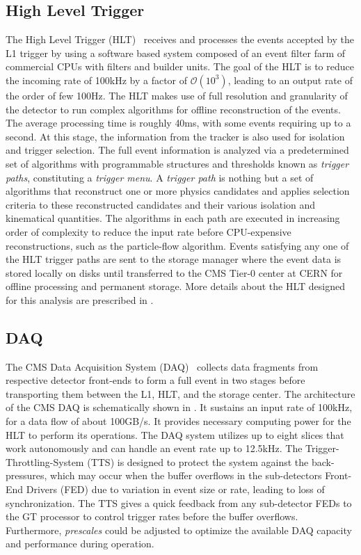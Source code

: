 \subsection{High Level Trigger}
The High Level Trigger (HLT)~\cite{daqhltTDR} receives and processes the events accepted by the L1 trigger by using a software based system
composed of an event filter farm of commercial CPUs with filters and builder units. The goal of the HLT is to reduce the incoming rate of 
100\unit{kHz} by a factor of $\mathcal{O}(10^{3})$, leading to an output rate of the order of few 100\unit{Hz}. 
The HLT makes use of full resolution and granularity of the detector to run complex algorithms for offline reconstruction of the events.
The average processing time is roughly 40\unit{ms}, with some events requiring up to a second. 
At this stage, the information from the tracker is also used for isolation and trigger selection. The full event information is analyzed via a 
predetermined set of algorithms with programmable structures and thresholds known as \emph{trigger paths}, constituting a \emph{trigger menu}.
A \emph{trigger path} is nothing but a set of algorithms that reconstruct one or more physics candidates and applies selection criteria to these
 reconstructed candidates and their various isolation and kinematical quantities. The algorithms in each path are executed in increasing order
of complexity to reduce the input rate before CPU-expensive reconstructions, such as the particle-flow algorithm. Events satisfying any one of the HLT 
trigger paths are sent to the storage manager where the event data is stored locally on disks until transferred to the CMS Tier-0 center at CERN
for offline processing and permanent storage. More details about the HLT designed for this analysis are prescribed in \chap{\ref{ch:QstarAnalysis}}.

\subsection{DAQ}
The CMS Data Acquisition System (DAQ)~\cite{daqhltTDR} collects data fragments from respective detector front-ends to form a full
event in two stages before transporting them between the L1, HLT, and the storage center. The architecture of the CMS DAQ is schematically
shown in \fig{\ref{fig:DAQsystem}}. It sustains an input rate of 100\unit{kHz}, for a data flow of about 100\unit{GB/s}. It provides
necessary computing power for the HLT to perform its operations. The DAQ system utilizes up to eight slices that work autonomously
and can handle an event rate up to 12.5\unit{kHz}. The Trigger-Throttling-System (\gls{TTS}) is designed to protect the system against the back-pressures, 
which may occur when the buffer overflows in the sub-detectors Front-End Drivers (\gls{FED}) due to variation in event size or rate, leading to loss of 
synchronization. The TTS gives a quick feedback from any sub-detector FEDs to the GT processor to control trigger rates before the buffer overflows. 
Furthermore, \emph{prescales} could be adjusted to optimize the available DAQ capacity and performance during operation.

